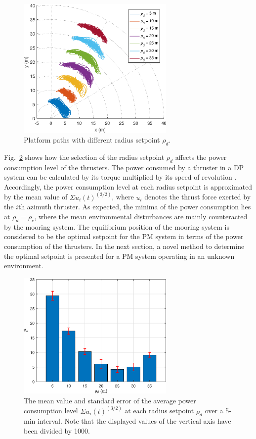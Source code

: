 \begin{sloppypar}
\begin{figure}[htbp]
	\centering\includegraphics[width=3.0in]{Images/setpoint.eps}
	\caption{Platform paths with different radius setpoint $\rho_d$.}
	\label{fig:setpoint}
\end{figure}

Fig.~\ref{fig:power_setpoint} shows how the selection of the radius setpoint $\rho_d$ affects the power consumption level of the thrusters. The power consumed by a thruster in a DP system can be calculated by its torque multiplied by its speed of revolution \cite{arditti2015thrust}. Accordingly, the power consumption level at each radius setpoint is approximated by the mean value of $\Sigma u_i(t)^{(3/2)}$, where $u_i$ denotes the thrust force exerted by the $i$th azimuth thruster. As expected, the minima of the power consumption lies at $\rho_d = \rho_e$, where the mean environmental disturbances are mainly counteracted by the mooring system. The equilibrium position of the mooring system is considered to be the optimal setpoint for the PM system in terms of the power consumption of the thrusters. In the next section, a novel method to determine the optimal setpoint is presented for a PM system operating in an unknown environment.

\begin{figure}[htbp]
	\centering\includegraphics[width=3.0in]{Images/setpoint_power.eps}
	\caption{The mean value and standard error of the average power consumption level $\Sigma u_i(t)^{(3/2)}$ at each radius setpoint $\rho_d$ over a 5-min interval. Note that the displayed values of the vertical axis have been divided by 1000.}
	\label{fig:power_setpoint}
\end{figure}


\end{sloppypar}
